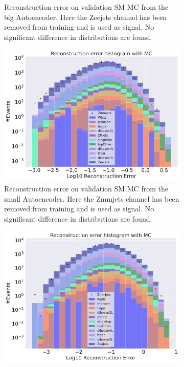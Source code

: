 \begin{figure}[H]
\begin{subfigure}{.45\textwidth}
        \caption{Reconstruction error on validation SM MC from the big Autoencoder. Here the Zeejets channel has been removed from training and 
        is used as signal. No significant difference in distributions are found. }
        \label{fig:vae_big_Zeejets}
    \end{subfigure}
    \hfill 
    \begin{subfigure}{.45\textwidth}
        \includegraphics[width=\textwidth]{Figures/VAE_testing/small/b_data_recon_big_rm3_feats_sig_Zmmjets.pdf}
        \caption{Reconstruction error on validation SM MC from the small Autoencoder. Here the Zmmjets channel has been removed from training and 
        is used as signal. No significant difference in distributions are found. }
        \label{fig:vae_small_Zmmjets}
    \end{subfigure}
    \hfill
    \begin{subfigure}{.45\textwidth}
        \includegraphics[width=\textwidth]{Figures/VAE_testing/big/b_data_recon_big_rm3_feats_sig_Zmmjets.pdf}

\end{subfigure}
\end{figure}

